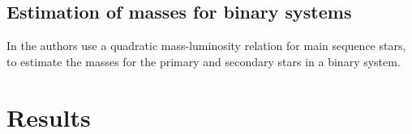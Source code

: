 \documentclass[draft]{aa}
\begin{document}
  \subsection{Estimation of masses for binary systems}
   \label{ssec:mass_binaries}


   In \cite{Borodina_2021} the authors use a quadratic mass-luminosity relation
   for main sequence stars, to estimate the masses for the primary and secondary
   stars in a binary system.


\section{Results}
 \label{sec:results}

 \cite{Jeffries_2001}



 \cite{Gonzales_2000}


 \cite{Jeffries_2001}
\end{document}
